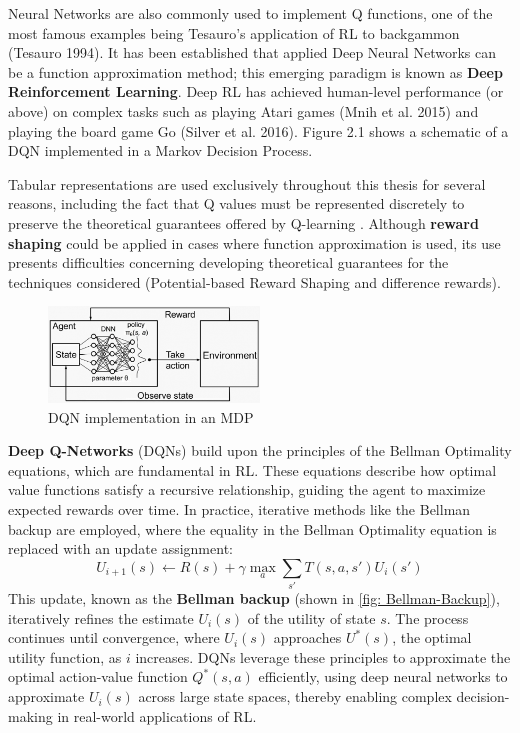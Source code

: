 Neural Networks are also commonly used to implement Q functions, one of the most famous examples being Tesauro’s application of RL to backgammon (Tesauro 1994). It has been established that applied Deep Neural Networks can be a function approximation method; this emerging paradigm is known as \textbf{Deep Reinforcement Learning}. Deep RL has achieved human-level performance (or above) on complex tasks such as playing Atari games (Mnih et al. 2015) and playing the board game Go (Silver et al. 2016). Figure 2.1 shows a schematic of a DQN implemented in a Markov Decision Process. 

Tabular representations are used exclusively throughout this thesis for several reasons, including the fact that Q values must be represented discretely to preserve the theoretical guarantees offered by Q-learning \parencite{Watkins}. Although \textbf{reward shaping} could be applied in cases where function approximation is used, its use presents difficulties concerning developing theoretical guarantees for the techniques considered (Potential-based Reward Shaping and difference rewards).

\begin{figure}[hbt!]
  \centering
  \includegraphics[width=0.5\textwidth]{images_pfe/1_ZZJ2FJFDNB9W-kdA2CfmTQ.png}
  \caption{DQN implementation in an MDP}
  \label{fig:dqn_mdp}
\end{figure}
\FloatBarrier

\textbf{Deep Q-Networks} (DQNs) build upon the principles of the Bellman Optimality equations, which are fundamental in RL. These equations describe how optimal value functions satisfy a recursive relationship, guiding the agent to maximize expected rewards over time. In practice, iterative methods like the Bellman backup are employed, where the equality in the Bellman Optimality equation is replaced with an update assignment:
\begin{equation}
    U_{i+1}(s) \leftarrow R(s) + \gamma \max_{a} \sum_{s'} T(s, a, s') U_i(s')
\end{equation}
This update, known as the \textbf{Bellman backup} (shown in \ref{fig: Bellman-Backup}), iteratively refines the estimate \( U_i(s) \) of the utility of state \( s \). The process continues until convergence, where \( U_i(s) \) approaches \( U^*(s) \), the optimal utility function, as \( i \) increases. DQNs leverage these principles to approximate the optimal action-value function \( Q^*(s, a) \) efficiently, using deep neural networks to approximate \( U_i(s) \) across large state spaces, thereby enabling complex decision-making in real-world applications of RL.

